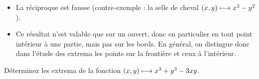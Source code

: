 \begin{rem}
\begin{itemize}
    \item La réciproque est fausse (contre-exemple : la selle de cheval \(\left(x,y\right)\longmapsto x^2-y^2\)). \\
    \item Ce résultat n'est valable que sur un ouvert, donc en particulier en tout point intérieur à une partie, mais pas sur les bords. En général, on distingue donc dans l'étude des extrema les points sur la frontière et ceux à l'intérieur.
\end{itemize}
\end{rem}

\begin{exo}
Déterminez les extrema de la fonction \(\left(x,y\right)\longmapsto x^3+y^3-3xy\).
\end{exo}


